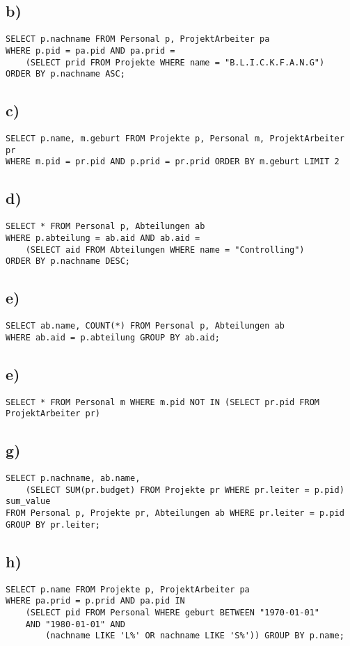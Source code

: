 \documentclass[a4paper,12pt,]{scrartcl}
\begin{document}
\subsection*{b)}
\begin{verbatim}
SELECT p.nachname FROM Personal p, ProjektArbeiter pa
WHERE p.pid = pa.pid AND pa.prid = 
    (SELECT prid FROM Projekte WHERE name = "B.L.I.C.K.F.A.N.G")
ORDER BY p.nachname ASC;
\end{verbatim}

\subsection*{c)}
\begin{verbatim}
SELECT p.name, m.geburt FROM Projekte p, Personal m, ProjektArbeiter pr
WHERE m.pid = pr.pid AND p.prid = pr.prid ORDER BY m.geburt LIMIT 2
\end{verbatim}

\subsection*{d)}
\begin{verbatim}
SELECT * FROM Personal p, Abteilungen ab
WHERE p.abteilung = ab.aid AND ab.aid =
    (SELECT aid FROM Abteilungen WHERE name = "Controlling")
ORDER BY p.nachname DESC;
\end{verbatim}

\subsection*{e)}
\begin{verbatim}
SELECT ab.name, COUNT(*) FROM Personal p, Abteilungen ab
WHERE ab.aid = p.abteilung GROUP BY ab.aid;
\end{verbatim}

\subsection*{e)}
\begin{verbatim}
SELECT * FROM Personal m WHERE m.pid NOT IN (SELECT pr.pid FROM ProjektArbeiter pr)
\end{verbatim}

\subsection*{g)}
\begin{verbatim}
SELECT p.nachname, ab.name,
    (SELECT SUM(pr.budget) FROM Projekte pr WHERE pr.leiter = p.pid) sum_value 
FROM Personal p, Projekte pr, Abteilungen ab WHERE pr.leiter = p.pid
GROUP BY pr.leiter;
\end{verbatim}

\subsection*{h)}
\begin{verbatim}
SELECT p.name FROM Projekte p, ProjektArbeiter pa
WHERE pa.prid = p.prid AND pa.pid IN
    (SELECT pid FROM Personal WHERE geburt BETWEEN "1970-01-01"
    AND "1980-01-01" AND
        (nachname LIKE 'L%' OR nachname LIKE 'S%')) GROUP BY p.name;
\end{verbatim}
\end{document}
